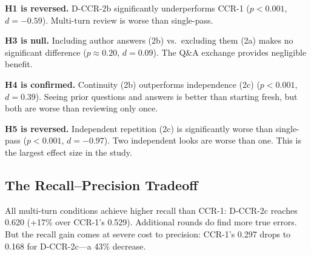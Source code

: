 \documentclass[11pt]{article}
\begin{document}
\begin{table}[t]
\centering
\caption{Paired tests ($N = 30$). All significant results survive Bonferroni correction ($\alpha = 0.0125$).}
\label{tab:tests}
\end{table}

\textbf{H1 is reversed.} D-CCR-2b significantly underperforms CCR-1 ($p < 0.001$, $d = -0.59$). Multi-turn review is worse than single-pass.

\textbf{H3 is null.} Including author answers (2b) vs.\ excluding them (2a) makes no significant difference ($p \approx 0.20$, $d = 0.09$). The Q\&A exchange provides negligible benefit.

\textbf{H4 is confirmed.} Continuity (2b) outperforms independence (2c) ($p < 0.001$, $d = 0.39$).
Seeing prior questions and answers is better than starting fresh, but both are worse than reviewing only once.

\textbf{H5 is reversed.} Independent repetition (2c) is significantly worse than single-pass ($p < 0.001$, $d = -0.97$).
Two independent looks are worse than one.
This is the largest effect size in the study.

\subsection{The Recall--Precision Tradeoff}

All multi-turn conditions achieve higher recall than CCR-1: D-CCR-2c reaches 0.620 (+17\% over CCR-1's 0.529).
Additional rounds do find more true errors.
But the recall gain comes at severe cost to precision: CCR-1's 0.297 drops to 0.168 for D-CCR-2c---a 43\% decrease.
\end{document}
